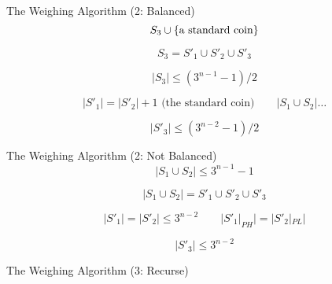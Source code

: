 \begin{frame}{The Weighing Algorithm (2: Balanced)}
  \[
    S_3 \cup \{\text{a standard coin}\}
  \]

  \[
    S_3 = S'_1 \cup S'_2 \cup S'_3
  \]

  \[
    |S_3| \le (3^{n-1} - 1) / 2
  \]

  \[
    |S'_1| = |S'_2| + 1 \text{ (the standard coin)} \qquad |S_1 \cup S_2| \dots
  \]

  \[
    |S'_3| \le (3^{n-2} - 1) / 2
  \]
\end{frame}

\begin{frame}{The Weighing Algorithm (2: Not Balanced)}
  \[
    |S_1 \cup S_2| \le 3^{n-1} - 1 
  \]

  \[
    |S_1 \cup S_2| = S'_1 \cup S'_2 \cup S'_3
  \]

  \[
    |S'_1| = |S'_2| \le 3^{n-2} \qquad |S'_1|_{PH}| = |S'_2|_{PL}|
  \]

  \[
    |S'_3| \le 3^{n-2}
  \]
\end{frame}

\begin{frame}{The Weighing Algorithm (3: Recurse)}
\end{frame}
